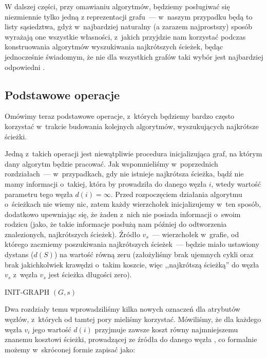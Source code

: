 W dalszej części, przy omawianiu algorytmów, będziemy posługiwać się niezmiennie tylko jedną z reprezentacji grafu~---  w~naszym przypadku będą to listy sąsiedztwa, gdyż w~najbardziej naturalny (a zarazem najprostszy) sposób wyrażają one wszystkie własności, z~jakich przyjdzie nam korzystać podczas konstruowania algorytmów wyszukiwania najkrótszych ścieżek, będąc jednocześnie świadomym, że nie dla wszystkich grafów taki wybór jest najbardziej odpowiedni \cite[$1$]{eCOMPASS_TR_005}.

\subsection{Podstawowe operacje}

Omówimy teraz podstawowe operacje, z~których będziemy bardzo często korzystać w~trakcie budowania kolejnych algorytmów, wyszukujących najkrótsze ścieżki.

Jedną z~takich operacji jest niewątpliwie procedura inicjalizująca graf, na którym dany algorytm będzie pracować. Jak wspomnieliśmy w~poprzednich rozdziałach~--- w~przypadkach, gdy nie istnieje najkrótsza ścieżka, bądź nie mamy informacji o~takiej, która by prowadziła do danego węzła $i$, wtedy wartość parametru tego węzła $d \left( i \right) = \infty$. Przed rozpoczęciem działania algorytmu o~ścieżkach nie wiemy nic, zatem każdy wierzchołek inicjalizujemy w~ten sposób, dodatkowo upewniając się, że żaden z~nich nie posiada informacji o~swoim rodzicu (jako, że takie informacje posłużą nam później do odtworzenia znalezionych, najkrótszych ścieżek). Źródło $v_{s}$~---  wierzchołek w~grafie, od którego zaczniemy poszukiwania najkrótszych ścieżek~---  będzie miało ustawiony dystans ($d \left( S \right)$) na wartość równą zeru (założyliśmy brak ujemnych cykli oraz brak jakichkolwiek krawędzi o~takim koszcie, więc ,,najkrótszą ścieżką'' do węzła $v_{s}$ z~węzła $v_{s}$ jest ścieżka długości zero).

\begin{algorithm}[!htbp]
\DontPrintSemicolon
{}
\caption{INIT-GRAPH $\left( G, s \right)$\label{alg:init-graph}}
\end{algorithm}

Dwa rozdziały temu wprowadziliśmy kilka nowych oznaczeń dla atrybutów węzłów, z~których od tamtej pory mieliśmy korzystać. Mówiliśmy, że dla każdego węzła $v_{i}$ jego wartość $d \left( i \right) $ przyjmuje zawsze koszt równy najmniejszemu znanemu kosztowi ścieżki, prowadzącej ze źródła do danego węzła , co formalnie możemy w~skróconej formie zapisać jako:

